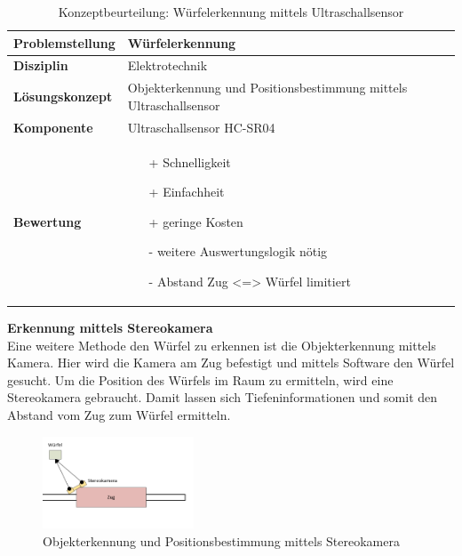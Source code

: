 \documentclass[../../main.tex]{subfiles}
\begin{document}
    \begin{flushleft}
        \begin{table}[h]
        \begin{tabular}{ | l | p{11cm} |}
        \hline
        \textbf{Problemstellung} & Würfelerkennung \\ \hline
        \textbf{Disziplin} & Elektrotechnik \\ \hline
        \textbf{Lösungskonzept} & Objekterkennung und Positionsbestimmung mittels Ultraschallsensor \\ \hline
        \textbf{Komponente} & Ultraschallsensor HC-SR04 \\ \hline
        \textbf{Bewertung} &  \begin{itemize}
                                \item[+] Schnelligkeit
                                \item[+] Einfachheit
                                \item[+] geringe Kosten 
                                \item[-] weitere Auswertungslogik nötig
                                \item[-] Abstand Zug <=> Würfel limitiert   
                              \end{itemize} \\ \hline
        \end{tabular}
        \caption{Konzeptbeurteilung: Würfelerkennung mittels Ultraschallsensor}
        \label{tab:konzept_wurfel_ultraschall}
    \end{table}
    \end{flushleft}


    \textbf{Erkennung mittels Stereokamera }\\
    Eine weitere Methode den Würfel zu erkennen ist die Objekterkennung mittels Kamera. Hier wird die Kamera am Zug
    befestigt und mittels Software den Würfel gesucht. Um die Position des Würfels im Raum zu ermitteln, wird eine 
    Stereokamera gebraucht. Damit lassen sich Tiefeninformationen und somit den Abstand vom Zug zum Würfel ermitteln.\\
    
    \begin{figure}[H] %
        \centering
        \includegraphics[width=0.4\textwidth]{wurfel_Stereokamera.png}
        \caption{Objekterkennung und Positionsbestimmung mittels Stereokamera}
    \end{figure}
\end{document}
